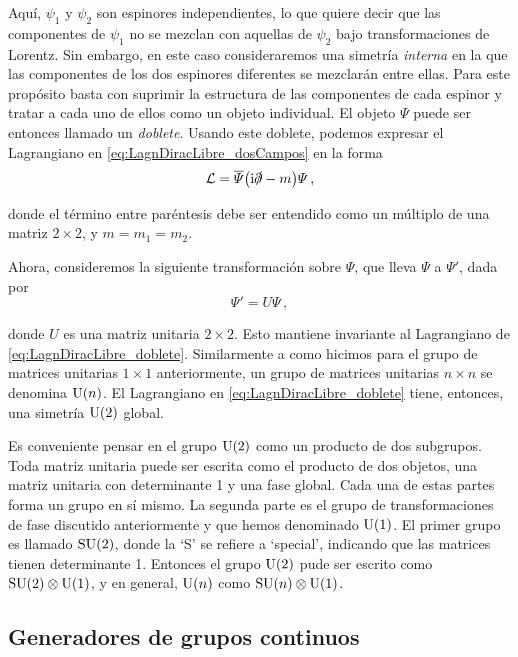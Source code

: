 Aquí, $\psi_1$ y $\psi_2$ son espinores independientes, lo que quiere decir que las componentes de $\psi_1$ no se mezclan con aquellas de $\psi_2$ bajo transformaciones de Lorentz. Sin embargo, en este caso consideraremos una simetría \emph{interna} en la que las componentes de los dos espinores diferentes se mezclarán entre ellas. Para este propósito basta con suprimir la estructura de las componentes de cada espinor y tratar a cada uno de ellos como un objeto individual. El objeto $\varPsi$ puede ser entonces llamado un \emph{doblete}. Usando este doblete, podemos expresar el Lagrangiano en \eqref{eq:LagnDiracLibre_dosCampos} en la forma
%
\begin{equation}
	\mathcal{L} = \overline{\varPsi} \qty(\mathrm{i} \slashed{\partial} - m) \varPsi \,,
\label{eq:LagnDiracLibre_doblete}
\end{equation}

\noindent donde el término entre paréntesis debe ser entendido como un múltiplo de una matriz $2 \times 2$, y $m = m_1 = m_2$.

Ahora, consideremos la siguiente transformación sobre $\varPsi$, que lleva $\varPsi$ a $\varPsi'$, dada por
%
\begin{equation}
	\varPsi' = U \varPsi \,,
\end{equation}

\noindent donde $U$ es una matriz unitaria $2 \times 2$. Esto mantiene invariante al Lagrangiano de \eqref{eq:LagnDiracLibre_doblete}. Similarmente a como hicimos para el grupo de matrices unitarias $1 \times 1$ anteriormente, un grupo de matrices unitarias $n \times n$ se denomina $\mathrm{U}(n)$. El Lagrangiano en \eqref{eq:LagnDiracLibre_doblete} tiene, entonces, una simetría $\mathrm{U}(2)$ global.

Es conveniente pensar en el grupo $\mathrm{U}(2)$ como un producto de dos subgrupos. Toda matriz unitaria puede ser escrita como el producto de dos objetos, una matriz unitaria con determinante 1 y una fase global. Cada una de estas partes forma un grupo en sí mismo. La segunda parte es el grupo de transformaciones de fase discutido anteriormente y que hemos denominado $\mathrm{U}(1)$. El primer grupo es llamado $\mathrm{SU}(2)$, donde la `S' se refiere a `special', indicando que las matrices tienen determinante 1. Entonces el grupo $\mathrm{U}(2)$ pude ser escrito como $\mathrm{SU}(2) \otimes \mathrm{U}(1)$, y en general, $\mathrm{U}(n)$ como $\mathrm{SU}(n) \otimes \mathrm{U}(1)$.




\subsection{Generadores de grupos continuos}

